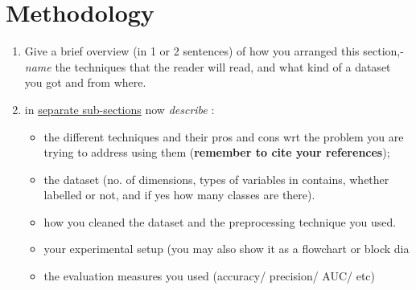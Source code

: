 \documentclass[a4paper]{article}
\begin{document}
\section{Methodology}
\begin{enumerate}
 \item Give a brief overview (in 1 or 2 sentences) of how you arranged this section,- \textit{name} the techniques that the reader will read, and what kind of a dataset you got and from where.
 \item in \underline{separate sub-sections} now \textit{describe} :
 \begin{itemize}
  \item the different techniques and their pros and cons wrt the problem you are trying to address using them (\textbf{remember to cite your references});
  \item the dataset (no. of dimensions, types of variables in contains, whether labelled or not, and if yes how many classes are there).
  \item how you cleaned the dataset and the preprocessing technique you used.
  \item your experimental setup (you may also show it as a flowchart or block dia
  \item the evaluation measures you used (accuracy/ precision/ AUC/ etc)
 \end{itemize}

\end{enumerate}
\end{document}
